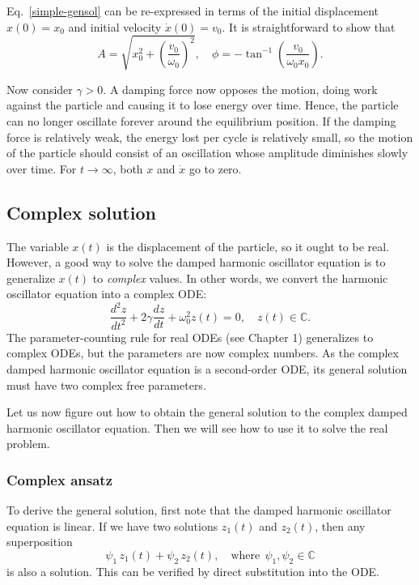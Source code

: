 \documentclass[10pt,a4paper]{article}
\begin{document}
Eq.~\eqref{simple-gensol} can be re-expressed in terms of the initial
displacement $x(0) = x_0$ and initial velocity $\dot{x}(0) = v_0$. It
is straightforward to show that
\begin{equation}
  A = \sqrt{x_0^2 + \left(\frac{v_0}{\omega_0}\right)^2},
  \quad \phi = -\tan^{-1}\left(\frac{v_0}{\omega_0 x_0}\right).
\end{equation}

Now consider $\gamma > 0$. A damping force now opposes the motion,
doing work against the particle and causing it to lose energy over
time.  Hence, the particle can no longer oscillate forever around the
equilibrium position. If the damping force is relatively weak, the
energy lost per cycle is relatively small, so the motion of the
particle should consist of an oscillation whose amplitude diminishes
slowly over time. For $t \rightarrow \infty$, both $x$ and $\dot{x}$
go to zero.
        
\subsection{Complex solution}
\label{complex-solution}

The variable $x(t)$ is the displacement of the particle, so it ought
to be real. However, a good way to solve the damped harmonic
oscillator equation is to generalize $x(t)$ to \emph{complex} values.
In other words, we convert the harmonic oscillator equation into a
complex ODE:
\begin{equation}
  \frac{d^2 z}{dt^2} + 2\gamma \frac{dz}{dt} + \omega_0^2 z(t) = 0,
  \quad z(t) \in \mathbb{C}.
\end{equation}
The parameter-counting rule for real ODEs (see Chapter 1) generalizes
to complex ODEs, but the parameters are now complex numbers. As the
complex damped harmonic oscillator equation is a second-order ODE, its
general solution must have two complex free parameters.

Let us now figure out how to obtain the general solution to the
complex damped harmonic oscillator equation.  Then we will see how to
use it to solve the real problem.

\subsubsection{Complex ansatz}
\label{complex-ansatz}

To derive the general solution, first note that the damped harmonic
oscillator equation is linear. If we have two solutions $z_1(t)$ and
$z_2(t)$, then any superposition
\begin{equation}
  \psi_1 \, z_1(t) + \psi_2 \,z_2(t),\quad \mathrm{where}\;\, \psi_1, \psi_2 \in \mathbb{C}
\end{equation}
is also a solution. This can be verified by direct substitution into the
ODE.
\end{document}

